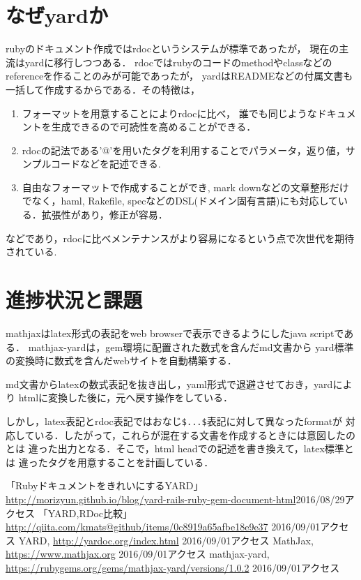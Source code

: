 \documentclass[10pt,a4j,twocolumn]{jsarticle}
\begin{document}
\section{なぜyardか}
rubyのドキュメント作成ではrdocというシステムが標準であったが，
現在の主流はyardに移行しつつある．
rdocではrubyのコードのmethodやclassなどのreferenceを作ることのみが可能であったが，
yardはREADMEなどの付属文書も一括して作成するからである．その特徴は，
\begin{enumerate}
\item フォーマットを用意することによりrdocに比べ，
誰でも同じようなドキュメントを生成できるので可読性を高めることができる\cite{a}．
\item rdocの記法である'@'を用いたタグを利用することでパラメータ，返り値，サンプルコードなどを記述できる\cite{b}.
\item 自由なフォーマットで作成することができ, mark downなどの文章整形だけでなく，haml, Rakefile, specなどのDSL(ドメイン固有言語)にも対応している．拡張性があり，修正が容易\cite{c}．
\end{enumerate}
などであり，rdocに比べメンテナンスがより容易になるという点で次世代を期待されている.


\section{進捗状況と課題}
mathjaxはlatex形式の表記をweb browserで表示できるようにしたjava scriptである\cite{mathjax}．
mathjax-yardは，gem環境に配置された数式を含んだmd文書から
yard標準の変換時に数式を含んだwebサイトを自動構築する\cite{mathjax-yard}．

md文書からlatexの数式表記を抜き出し，yaml形式で退避させておき，yardにより
htmlに変換した後に，元へ戻す操作をしている．

しかし，latex表記とrdoc表記ではおなじ\verb|$...$|表記に対して異なったformatが
対応している．したがって，これらが混在する文書を作成するときには意図したのとは
違った出力となる．そこで，html headでの記述を書き換えて，latex標準とは
違ったタグを用意することを計画している．

\begin{thebibliography}{3}
「RubyドキュメントをきれいにするYARD」\url{http://morizyun.github.io/blog/yard-rails-ruby-gem-document-html}2016/08/29アクセス
「YARD,RDoc比較」\url{http://qiita.com/kmats@github/items/0c8919a65afbe18e9e37} 2016/09/01アクセス
YARD, \url{http://yardoc.org/index.html} 2016/09/01アクセス
MathJax, \url{https://www.mathjax.org} 2016/09/01アクセス
 mathjax-yard, \url{https://rubygems.org/gems/mathjax-yard/versions/1.0.2} 2016/09/01アクセス
\end{thebibliography}
\end{document}
